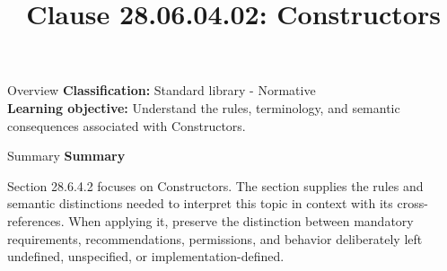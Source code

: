 \documentclass[10pt,letterpaper]{article}
\title{Clause 28.06.04.02: Constructors}
\author{}
\date{}
\begin{document}
\maketitle
\begin{CornellOverviewBox}{Overview}
\textbf{Classification:} Standard library - Normative\\[2pt]
\textbf{Learning objective:} Understand the rules, terminology, and semantic consequences associated with Constructors.
\end{CornellOverviewBox}\begin{CornellSummaryBox}{Summary}
{\sffamily\bfseries\color{Accent} Summary}\par\vspace{3pt}Section 28.6.4.2 focuses on Constructors. The section supplies the rules and semantic distinctions needed to interpret this topic in context with its cross-references. When applying it, preserve the distinction between mandatory requirements, recommendations, permissions, and behavior deliberately left undefined, unspecified, or implementation-defined.
\end{CornellSummaryBox}
\end{document}
